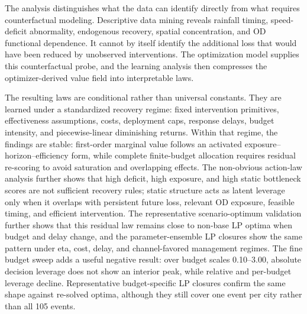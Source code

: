 The analysis distinguishes what the data can identify directly from what requires counterfactual modeling. Descriptive data mining reveals rainfall timing, speed-deficit abnormality, endogenous recovery, spatial concentration, and OD functional dependence. It cannot by itself identify the additional loss that would have been reduced by unobserved interventions. The optimization model supplies this counterfactual probe, and the learning analysis then compresses the optimizer-derived value field into interpretable laws.

The resulting laws are conditional rather than universal constants. They are learned under a standardized recovery regime: fixed intervention primitives, effectiveness assumptions, costs, deployment caps, response delays, budget intensity, and piecewise-linear diminishing returns. Within that regime, the findings are stable: first-order marginal value follows an activated exposure--horizon--efficiency form, while complete finite-budget allocation requires residual re-scoring to avoid saturation and overlapping effects. The non-obvious action-law analysis further shows that high deficit, high exposure, and high static bottleneck scores are not sufficient recovery rules; static structure acts as latent leverage only when it overlaps with persistent future loss, relevant OD exposure, feasible timing, and efficient intervention. The representative scenario-optimum validation further shows that this residual law remains close to non-base LP optima when budget and delay change, and the parameter-ensemble LP closures show the same pattern under eta, cost, delay, and channel-favored management regimes. The fine budget sweep adds a useful negative result: over budget scales 0.10--3.00, absolute decision leverage does not show an interior peak, while relative and per-budget leverage decline. Representative budget-specific LP closures confirm the same shape against re-solved optima, although they still cover one event per city rather than all 105 events.

